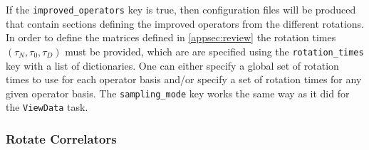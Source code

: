 \documentclass[12pt,letterpaper,notitlepage]{article}
\newcommand{\key}[1]{\textcolor{Emerald}{\texttt{\small{#1}}}}
\begin{document}
If the \key{improved\_operators} key is true,
then configuration files will be produced that contain sections defining the improved operators from the different rotations.
In order to define the matrices defined in \autoref{appsec:review} the rotation times $(\tau_N, \tau_0, \tau_D)$ must be provided,
which are are specified using the \key{rotation\_times} key with a list of dictionaries.
One can either specify a global set of rotation times to use for each operator basis
and/or specify a set of rotation times for any given operator basis.
The \key{sampling\_mode} key works the same way as it did for the \key{ViewData} task.

\subsubsection{Rotate Correlators}
\end{document}
